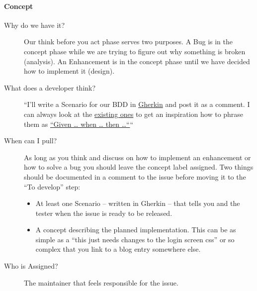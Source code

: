 \documentclass[letterpaper,10pt,english]{sphinxmanual}
\begin{document}
\paragraph{Concept}
\label{bugtracker/kanban:concept}\begin{description}
\item[{Why do we have it?}] \leavevmode
Our think before you act phase serves two purposes. A Bug is in the concept
phase while we are trying to figure out why something is broken (analysis). An
Enhancement is in the concept phase until we have decided how to implement it
(design).

\item[{What does a developer think?}] \leavevmode
``I’ll write a Scenario for our BDD in \href{https://github.com/cucumber/cucumber/wiki/Gherkin}{Gherkin} and post it as a comment. I
can always look at the \href{https://ci.tmit.eu/job/acceptance-test/cucumber-html-reports/?}{existing ones} to get an inspiration how to phrase
them as \href{https://github.com/cucumber/cucumber/wiki/Given-When-Then}{“Given … when … then …“}``

\item[{When can I pull?}] \leavevmode
As long as you think and discuss on how to implement an enhancement or how to
solve a bug you should leave the concept label assigned. Two things should be
documented in a comment to the issue before moving it to the ``To develop''
step:
\begin{itemize}
\item {} 
At least one Scenario – written in Gherkin – that tells you and the tester
when the issue is ready to be released.

\item {} 
A concept describing the planned implementation. This can be as simple as
a “this just needs changes to the login screen css” or so complex that you
link to a blog entry somewhere else.

\end{itemize}

\item[{Who is Assigned?}] \leavevmode
The maintainer that feels responsible for the issue.

\end{description}
\end{document}
